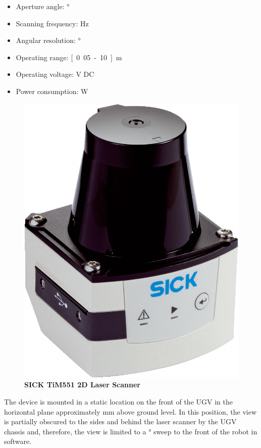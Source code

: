 \documentclass[titlepage,12pt,a4paper]{article}
\begin{document}
\begin{itemize}
	\item Aperture angle: \unit[270]{\degree}
	\item Scanning frequency: \unit[15]{Hz}
	\item Angular resolution: \unit[1]{\degree}
	\item Operating range: \unit[0.05-10]{m}
	\item Operating voltage: \unit[9-28]{V} DC
	\item Power consumption: \unit[3]{W}
\end{itemize}

\begin{figure}[h!]
	\centering
	
	\includegraphics[scale=0.2]{figures/sick_lidar.png}
	\caption{\textbf{SICK TiM551 2D Laser Scanner}}
	\label{figure:sick_lidar}
\end{figure}

The device is mounted in a static location on the front of the UGV in the horizontal plane approximately \unit[300]{mm} above ground level. In this position, the view is partially obscured to the sides and behind the laser scanner by the UGV chassis and, therefore, the view is limited to a \unit[150]{\degree} sweep to the front of the robot in software.
\end{document}
